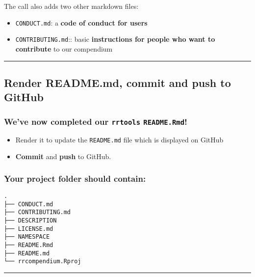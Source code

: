 \documentclass[
  letterpaper,
  DIV=11,
  numbers=noendperiod]{scrreprt}
\providecommand{\tightlist}{%
  \setlength{\itemsep}{0pt}\setlength{\parskip}{0pt}}\usepackage{longtable,booktabs,array}
\begin{document}
The call also adds two other markdown files:

\begin{itemize}
\tightlist
\item
  \texttt{CONDUCT.md}: a \textbf{code of conduct for users}
\item
  \texttt{CONTRIBUTING.md}:: basic \textbf{instructions for people who
  want to contribute} to our compendium
\end{itemize}

\begin{center}\rule{0.5\linewidth}{0.5pt}\end{center}

\hypertarget{render-readme.md-commit-and-push-to-github}{%
\subsection{Render README.md, commit and push to
GitHub}\label{render-readme.md-commit-and-push-to-github}}

\hypertarget{weve-now-completed-our-rrtools-readme.rmd}{%
\subsubsection{\texorpdfstring{We've now completed our \texttt{rrtools}
\texttt{README.Rmd}!
🎉}{We've now completed our rrtools README.Rmd! 🎉}}\label{weve-now-completed-our-rrtools-readme.rmd}}

\begin{itemize}
\item
  Render it to update the \texttt{README.md} file which is displayed on
  GitHub
\item
  \textbf{Commit} and \textbf{push} to GitHub.
\end{itemize}

\hypertarget{your-project-folder-should-contain}{%
\subsubsection{Your project folder should
contain:}\label{your-project-folder-should-contain}}

\begin{verbatim}
.
├── CONDUCT.md
├── CONTRIBUTING.md
├── DESCRIPTION
├── LICENSE.md
├── NAMESPACE
├── README.Rmd
├── README.md
└── rrcompendium.Rproj
\end{verbatim}

\begin{center}\rule{0.5\linewidth}{0.5pt}\end{center}
\end{document}

